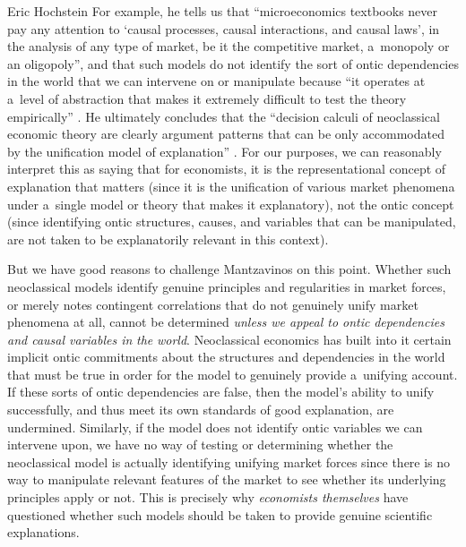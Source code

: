 \begin{artengenv}{Eric Hochstein}
For example, he tells us that ``microeconomics textbooks never pay any attention to ‘causal processes, causal interactions, and causal laws', in the analysis of any type of market, be it the competitive market, a~monopoly or an oligopoly'', and that such models do not identify the sort of ontic dependencies in the world that we can intervene on or manipulate because ``it operates at a~level of abstraction that makes it extremely difficult to test the theory empirically''
\parencite[][p.13]{mantzavinos_explanatory_2016}. %
 He ultimately concludes that the ``decision calculi of neoclassical economic theory are clearly argument patterns that can be only accommodated by the unification model of explanation'' 
\parencite[][p.13]{mantzavinos_explanatory_2016}. %
 For our purposes, we can reasonably interpret this as saying that for economists, it is the representational concept of explanation that matters (since it is the unification of various market phenomena under a~single model or theory that makes it explanatory), not the ontic concept (since identifying ontic structures, causes, and variables that can be manipulated, are not taken to be explanatorily relevant in this context).

But we have good reasons to challenge Mantzavinos on this point. Whether such neoclassical models identify genuine principles and regularities in market forces, or merely notes contingent correlations that do not genuinely unify market phenomena at all, cannot be determined \textit{unless we appeal to ontic} \textit{dependencies} \textit{and causal variables in} \textit{the} \textit{world}. Neoclassical economics has built into it certain implicit ontic commitments about the structures and dependencies in the world that must be true in order for the model to genuinely provide a~unifying account. If these sorts of ontic dependencies are false, then the model's ability to unify successfully, and thus meet its own standards of good explanation, are undermined. Similarly, if the model does not identify ontic variables we can intervene upon, we have no way of testing or determining whether the neoclassical model is actually identifying unifying market forces since there is no way to manipulate relevant features of the market to see whether its underlying principles apply or not. This is precisely why \textit{economists themselves} have questioned whether such models should be taken to provide genuine scientific explanations.


\end{artengenv}
